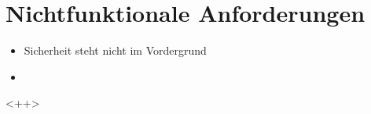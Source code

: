 
\chapter{Nichtfunktionale Anforderungen}

\begin{itemize}
	\item Sicherheit steht nicht im Vordergrund
	\item 
\end{itemize}<++>
